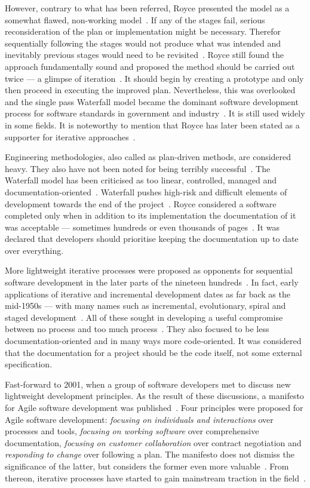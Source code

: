 \documentclass[english]{tktltiki2}
\begin{document}
However, contrary to what has been referred, Royce presented the model as a somewhat flawed, non-working model~\cite{Roy70}. If any of the stages fail, serious reconsideration of the plan or implementation might be necessary. Therefor sequentially following the stages would not produce what was intended and inevitably previous stages would need to be revisited~\cite{Roy70}. Royce still found the approach fundamentally sound and proposed the method should be carried out twice — a glimpse of iteration~\cite{Roy70, Boe88}. It should begin by creating a prototype and only then proceed in executing the improved plan. Nevertheless, this was overlooked and the single pass Waterfall model became the dominant software development process for software standards in government and industry~\cite{Boe88, LB03}. It is still used widely in some fields. It is noteworthy to mention that Royce has later been stated as a supporter for iterative approaches~\cite{LB03}.

Engineering methodologies, also called as plan-driven methods, are considered heavy. They also have not been noted for being terribly successful~\cite{Fow05}. The Waterfall model has been criticised as too linear, controlled, managed and documentation-oriented~\cite{Boe88, LB03, Fow05}. Waterfall pushes high-risk and difficult elements of development towards the end of the project~\cite{VB09}. Royce considered a software completed only when in addition to its implementation the documentation of it was acceptable — sometimes hundreds or even thousands of pages~\cite{Roy70}. It was declared that developers should prioritise keeping the documentation up to date over everything.

More lightweight iterative processes were proposed as opponents for sequential software development in the later parts of the nineteen hundreds~\cite{LB03}. In fact, early applications of iterative and incremental development dates as far back as the mid-1950s — with many names such as incremental, evolutionary, spiral and staged development~\cite{Boe88, LB03, Fow05}. All of these sought in developing a useful compromise between no process and too much process~\cite{Fow05}. They also focused to be less documentation-oriented and in many ways more code-oriented. It was considered that the documentation for a project should be the code itself, not some external specification.

Fast-forward to 2001, when a group of software developers met to discuss new lightweight development principles. As the result of these discussions, a manifesto for Agile software development was published~\cite{BBB01a}. Four principles were proposed for Agile software development: \emph{focusing on individuals and interactions} over processes and tools, \emph{focusing on working software} over comprehensive documentation, \emph{focusing on customer collaboration} over contract negotiation and \emph{responding to change} over following a plan. The manifesto does not dismiss the significance of the latter, but considers the former even more valuable~\cite{BBB01a}. From thereon, iterative processes have started to gain mainstream traction in the field~\cite{LB03, Fow05}.
\end{document}
